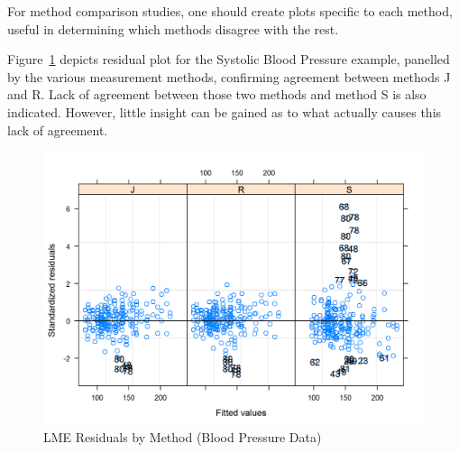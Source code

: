 \documentclass[12pt, a4paper]{report}
\theoremstyle{definition}
\theoremstyle{remark}
\begin{document}


For method comparison studies, one should create plots specific to each method, useful in determining which methods disagree with the rest.

Figure~\ref{bloodnlme-ResidPlot} depicts residual plot for the Systolic Blood Pressure example, panelled by the various measurement methods, confirming agreement between methods J and R. Lack of agreement between those two methods and method S is also indicated. However, little insight can be gained as to what actually causes this lack of agreement. 
\begin{figure}[h!]
	\centering
	\includegraphics[width=0.8\linewidth]{images/bloodnlme-ResidPlot}
	\caption{LME Residuals by Method (Blood Pressure Data)}
	\label{bloodnlme-ResidPlot}
\end{figure}





%
\end{document}
